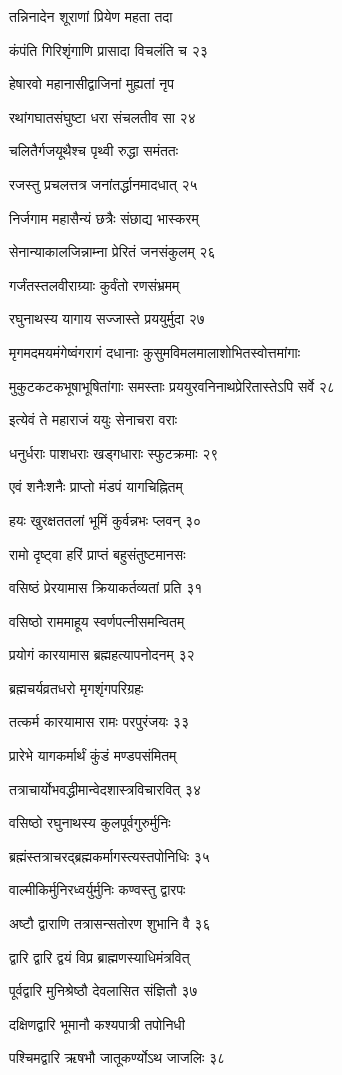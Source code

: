 तन्निनादेन शूराणां प्रियेण महता तदा

कंपंति गिरिशृंगाणि प्रासादा विचलंति च २३

हेषारवो महानासीद्वाजिनां मुह्यतां नृप

रथांगघातसंघुष्टा धरा संचलतीव सा २४

चलितैर्गजयूथैश्च पृथ्वी रुद्धा समंततः

रजस्तु प्रचलत्तत्र जनांतर्द्धानमादधात् २५

निर्जगाम महासैन्यं छत्रैः संछाद्य भास्करम्

सेनान्याकालजिन्नाम्ना प्रेरितं जनसंकुलम् २६

गर्जंतस्तलवीराग्र्याः कुर्वंतो रणसंभ्रमम्

रघुनाथस्य यागाय सज्जास्ते प्रययुर्मुदा २७

मृगमदमयमंगेष्वंगरागं दधानाः कुसुमविमलमालाशोभितस्वोत्तमांगाः

मुकुटकटकभूषाभूषितांगाः समस्ताः प्रययुरवनिनाथप्रेरितास्तेऽपि सर्वे २८

इत्येवं ते महाराजं ययुः सेनाचरा वराः

धनुर्धराः पाशधराः खड्गधाराः स्फुटक्रमाः २९

एवं शनैःशनैः प्राप्तो मंडपं यागचिह्नितम्

हयः खुरक्षततलां भूमिं कुर्वन्नभः प्लवन् ३०

रामो दृष्ट्वा हरिं प्राप्तं बहुसंतुष्टमानसः

वसिष्ठं प्रेरयामास क्रियाकर्तव्यतां प्रति ३१

वसिष्ठो राममाहूय स्वर्णपत्नीसमन्वितम्

प्रयोगं कारयामास ब्रह्महत्यापनोदनम् ३२

ब्रह्मचर्यव्रतधरो मृगशृंगपरिग्रहः

तत्कर्म कारयामास रामः परपुरंजयः ३३

प्रारेभे यागकर्मार्थं कुंडं मण्डपसंमितम्

तत्राचार्योभवद्धीमान्वेदशास्त्रविचारवित् ३४

वसिष्ठो रघुनाथस्य कुलपूर्वगुरुर्मुनिः

ब्रह्मंस्तत्राचरद्ब्रह्मकर्मागस्त्यस्तपोनिधिः ३५

वाल्मीकिर्मुनिरध्वर्युर्मुनिः कण्वस्तु द्वारपः

अष्टौ द्वाराणि तत्रासन्सतोरण शुभानि वै ३६

द्वारि द्वारि द्वयं विप्र ब्राह्मणस्याधिमंत्रवित्

पूर्वद्वारि मुनिश्रेष्ठौ देवलासित संज्ञितौ ३७

दक्षिणद्वारि भूमानौ कश्यपात्री तपोनिधी

पश्चिमद्वारि ऋषभौ जातूकर्ण्योऽथ जाजलिः ३८

